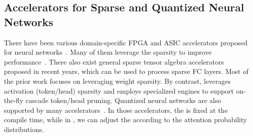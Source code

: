 \subsection{Accelerators for Sparse and Quantized Neural Networks}
There have been various domain-specific FPGA and ASIC accelerators proposed for neural networks~\cite{mubarik2020printed, ramanathan2020look, song2020vr, kim2020duplo, liu2020duet, mo2020tfe, weng2020dsagen, vilim2020gorgon, ke2020recnmp, evans2020jpeg, gupta2020deeprecsys, zhao2020smartexchange, baek2020multi, ji2019fpsa, ishida2020supernpu, gan2020ptolemy, he2020newton, ghodrati2020planaria, feng2020mesorasi, singh2020nebula, imani2020deep, shiflett2020pixel, gudaparthi2019wire, shao2019simba, akin2019zcomp, huang2019ecnn}. Many of them leverage the sparsity to improve performance~\cite{10.1109/ISCA.2016.30, zhang2016cambricon, parashar2017scnn, zhou2018cambricon, yang2019sparse, gondimalla2019sparten, sharify2019laconic, cong2018understanding, yang2020procrustes, gong2020save, hwang2020centaur, qin2020sigma, delmas2019bit, yan2020hygcn, song2020accpar, zhang2020enabling, hua2019boosting}.
There also exist general sparse tensor algebra accelerators~\cite{chen2020tpspmv, hegde2019extensor, kanellopoulos2019smash, zhu2019sparse, kwon2019tensordimm, mahmoud2020tensordash, srivastava2020matraptor, asgari2020alrescha, srivastava2020tensaurus, weng2020hybrid, lascorz2019shapeshifter, sadi2019efficient} proposed in recent years, which can be used to process sparse FC layers. 
Most of the prior work focuses on leveraging weight sparsity. By contrast, \name leverages activation (token/head) sparsity and employs specialized \topk engines to support on-the-fly cascade token/head pruning.
Quantized neural networks are also supported by many accelerators~\cite{lee2018unpu, judd2016stripes, sharify2018loom, umuroglu2018bismo, rzayev2017deeprecon, sharma2018bit, nvtensor, jouppi2017datacenter, song2020drq, zadeh2020gobo}. 
In those accelerators, the \bitwidth is fixed at the compile time, while in \name, we can adjust the \bitwidth according to the attention probability distributions.


